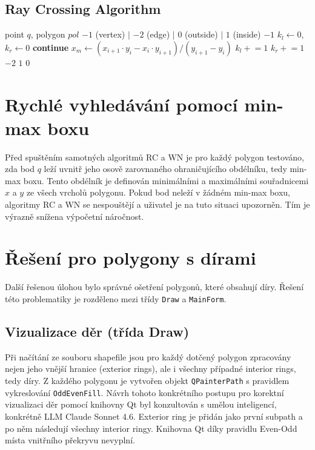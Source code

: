 \documentclass[11pt, a4paper]{article}
\begin{document}
\subsection{Ray Crossing Algorithm}

\begin{algorithm}[H] \caption{Ray Crossing} 
\begin{algorithmic}[1]
\Require point $q$, polygon $pol$ 
\Ensure $-1$ (vertex) $|$ $-2$ (edge) $|$ $0$ (outside) $|$ $1$ (inside)
     \Return $-1$ \EndIf
\EndFor
\State $k_l \gets 0$, $k_r \gets 0$
     \textbf{continue} \EndIf
    \State $x_m \gets (x_{i+1} \cdot y_i - x_i \cdot y_{i+1}) / (y_{i+1} - y_i)$
     $k_l \mathrel{+}= 1$ \EndIf
     $k_r \mathrel{+}= 1$ \EndIf
\EndFor
{} \Return $-2$ \EndIf
{} \Return $1$ \Else{} \Return $0$ \EndIf
\end{algorithmic} 
\end{algorithm} 

\section{Rychlé vyhledávání pomocí min-max boxu}
Před spuštěním samotných algoritmů RC a WN je pro každý polygon testováno, zda bod $q$ leží uvnitř jeho osově zarovnaného ohraničujícího obdélníku, tedy min-max boxu. Tento obdélník je definován minimálními a maximálními souřadnicemi $x$ a $y$ ze všech vrcholů polygonu. Pokud bod neleží v žádném min-max boxu, algoritmy RC a WN se nespouštějí a uživatel je na tuto situaci upozorněn. Tím je výrazně snížena výpočetní náročnost.

\newpage

\section{Řešení pro polygony s dírami}
Další řešenou úlohou bylo správné ošetření polygonů, které obsahují díry. Řešení této problematiky je rozděleno mezi třídy \texttt{Draw} a \texttt{MainForm}.

\subsection{Vizualizace děr (třída Draw)}
Při načítání ze souboru shapefile jsou pro každý dotčený polygon zpracovány nejen jeho vnější hranice (exterior rings), ale i všechny případné interior rings, tedy díry. Z každého polygonu je vytvořen objekt \texttt{QPainterPath} s pravidlem vykreslování \texttt{OddEvenFill}. Návrh tohoto konkrétního postupu pro korektní vizualizaci děr pomocí knihovny Qt byl konzultován s umělou inteligencí, konkrétně LLM Claude Sonnet 4.6. Exterior ring je přidán jako první subpath a po něm následují všechny interior ringy. Knihovna Qt díky pravidlu Even-Odd místa vnitřního překryvu nevyplní.
\end{document}
